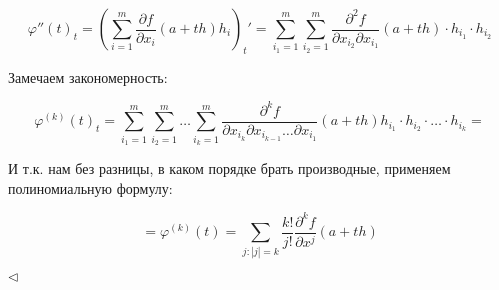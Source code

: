 \documentclass{article}
\begin{document}
$$
\varphi''(t)_t = \left(\sum_{i=1}^m \frac{\partial f} {\partial x_i} (a + th) h_i \right)_t' = \sum_{i_1=1}^m \sum_{i_2=1}^m \frac{\partial^2 f} {\partial x_{i_2} \partial x_{i_1}} (a + th) \cdot h_{i_1} \cdot h_{i_2}
$$

Замечаем закономерность:

$$
\varphi^{(k)}(t)_t = \sum_{i_1 = 1}^m \sum_{i_2 = 1}^m \dots \sum_{i_k = 1}^m \frac{\partial^k f}{\partial x_{i_k} \partial x_{i_{k-1}} \dots \partial x_{i_1}} (a + th) h_{i_1} \cdot h_{i_2} \cdot \dots \cdot h_{i_k} =
$$

И т.к. нам без разницы, в каком порядке брать производные, применяем полиномиальную формулу:

$$
= \varphi^{(k)}(t) = \sum_{j:  |j| = k} \frac{k!}{j!} \frac {\partial ^k f} {\partial x ^j} (a + th)
$$

$\lhd$
\end{document}
